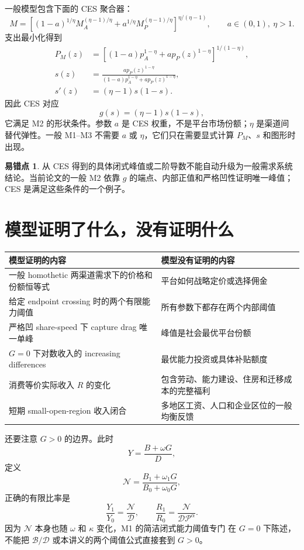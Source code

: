 \documentclass[UTF8,11pt,scheme=chinese,fontset=windows]{ctexart}
\newcommand{\calB}{\mathcal B}
\newcommand{\calD}{\mathcal D}
\newcommand{\calP}{\mathcal P}
\theoremstyle{definition}
\newtheorem{commonerror}{易错点}[section]
\begin{document}
一般模型包含下面的 CES 聚合器：
\[
M=\left[(1-a)^{1/\eta}M_A^{(\eta-1)/\eta}
+a^{1/\eta}M_P^{(\eta-1)/\eta}\right]^{\eta/(\eta-1)},
\qquad a\in(0,1),\ \eta>1.
\]
支出最小化得到
\begin{align*}
P_M(z)&=\left[(1-a)p_A^{1-\eta}
+ap_P(z)^{1-\eta}\right]^{1/(1-\eta)},\\
s(z)&=\frac{ap_P(z)^{1-\eta}}
{(1-a)p_A^{1-\eta}+ap_P(z)^{1-\eta}},\\
s'(z)&=(\eta-1)s(1-s).
\end{align*}
因此 CES 对应
\[
g(s)=(\eta-1)s(1-s),
\]
它满足 M2 的形状条件。参数 \(a\) 是 CES 权重，不是平台市场份额；\(\eta\) 是渠道间
替代弹性。一般 M1--M3 不需要 \(a\) 或 \(\eta\)，它们只在需要显式计算 \(P_M\)、\(s\)
和图形时出现。

\begin{commonerror}
从 CES 得到的具体闭式峰值或二阶导数不能自动升级为一般需求系统结论。当前论文的一般 M2
依靠 \(g\) 的端点、内部正值和严格凹性证明唯一峰值；CES 是满足这些条件的一个例子。
\end{commonerror}

\section{模型证明了什么，没有证明什么}

\begin{center}
\small
\begin{tabularx}{\textwidth}{X X}
\toprule
模型证明的内容 & 模型没有证明的内容 \\
\midrule
一般 homothetic 两渠道需求下的价格和份额恒等式 & 平台如何战略定价或选择佣金 \\
给定 endpoint crossing 时的两个有限能力阈值 & 所有参数下都存在两个内部阈值 \\
严格凹 share-speed 下 capture drag 唯一单峰 & 峰值是社会最优平台份额 \\
\(G=0\) 下对数收入的 increasing differences & 最优能力投资或具体补贴额度 \\
消费等价实际收入 \(R\) 的变化 & 包含劳动、能力建设、住房和迁移成本的完整福利 \\
短期 small-open-region 收入闭合 & 多地区工资、人口和企业区位的一般均衡反馈 \\
\bottomrule
\end{tabularx}
\end{center}

还要注意 \(G>0\) 的边界。此时
\[
Y=\frac{B+\omega G}{D},
\]
定义
\[
\mathcal N=\frac{B_1+\omega_1G}{B_0+\omega_0G},
\]
正确的有限比率是
\[
\frac{Y_1}{Y_0}=\frac{\mathcal N}{\calD},
\qquad
\frac{R_1}{R_0}=\frac{\mathcal N}{\calD\calP^\alpha}.
\]
因为 \(\mathcal N\) 本身也随 \(\omega\) 和 \(\kappa\) 变化，M1 的简洁闭式能力阈值专门
在 \(G=0\) 下陈述，不能把 \(\calB/\calD\) 或本讲义的两个阈值公式直接套到 \(G>0\)。
\end{document}

